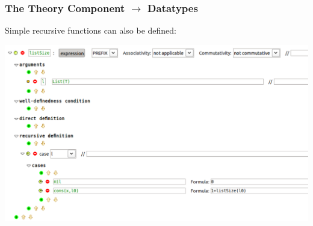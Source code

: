 \documentclass{beamer}
\begin{document}
	\begin{frame}
		\frametitle{The Theory Component $\rightarrow$ Datatypes}
		Simple recursive functions can also be defined:
		\begin{center}
			\includegraphics[scale=0.4]{ListSize}
		\end{center}
	\end{frame}
\end{document}
